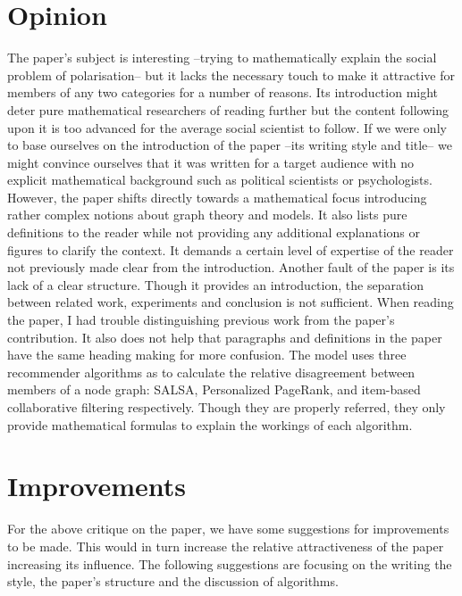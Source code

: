 \documentclass[14]{article}
\begin{document}
\section{Opinion}
The paper's subject is interesting --trying to mathematically explain the social problem of polarisation-- but it lacks the necessary touch to make it attractive for members of any two categories for a number of reasons. Its introduction might deter pure mathematical researchers of reading further but the content following upon it is too advanced for the average social scientist to follow.
\newline
If we were only to base ourselves on the introduction of the paper --its writing style and title-- we might convince ourselves that it was written for a target audience with no explicit mathematical background such as political scientists or psychologists. However, the paper shifts directly towards a mathematical focus introducing rather complex notions about graph theory and models. It also lists pure definitions to the reader while not providing any additional explanations or figures to clarify the context. It demands a certain level of expertise of the reader not previously made clear from the introduction. 
\newline
Another fault of the paper is its lack of a clear structure. Though it provides an introduction, the separation between related work, experiments and conclusion is not sufficient. When reading the paper, I had trouble distinguishing previous work from the paper's contribution. It also does not help that paragraphs and definitions in the paper have the same heading making for more confusion.
\newline
The model uses three recommender algorithms as to calculate the relative disagreement between members of a node graph: SALSA\cite{lempel2001salsa}, Personalized PageRank\cite{page1999pagerank}, and item-based collaborative filtering\cite{linden2003amazon} respectively. Though they are properly referred, they only provide mathematical formulas to explain the workings of each algorithm. 

\section{Improvements}
For the above critique on the paper, we have some suggestions for improvements to be made. This would in turn increase the relative attractiveness of the paper increasing its influence. The following suggestions are focusing on the writing the style, the paper's structure and the discussion of algorithms.
\end{document}
